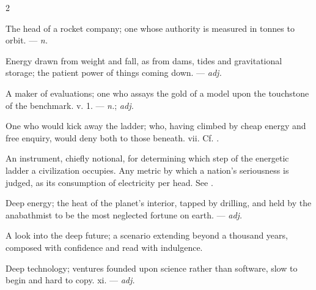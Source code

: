 \begin{multicols}{2}

 The head of a rocket company; one whose authority is measured in tonnes to orbit.  —  \textit{n.}

 Energy drawn from weight and fall, as from dams, tides and gravitational storage; the patient power of things coming down. —  \textit{adj.}

 A maker of evaluations; one who assays the gold of a model upon the touchstone of the benchmark.   v. 1. —  \textit{n.};  \textit{adj.}

 One who would kick away the ladder; who, having climbed by cheap energy and free enquiry, would deny both to those beneath.   vii. Cf. .

  An instrument, chiefly notional, for determining which step of the energetic ladder a civilization occupies.   Any metric by which a nation's seriousness is judged, as its consumption of electricity per head.  See .

 Deep energy; the heat of the planet's interior, tapped by drilling, and held by the anabathmist to be the most neglected fortune on earth. —  \textit{adj.}

 A look into the deep future; a scenario extending beyond a thousand years, composed with confidence and read with indulgence.

 Deep technology; ventures founded upon science rather than software, slow to begin and hard to copy.   xi. —  \textit{adj.}


\end{multicols}
